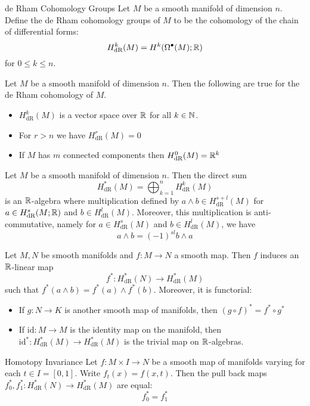 \documentclass[a4paper]{article}
\begin{document}
\begin{defn}{de Rham Cohomology Groups}{} Let $M$ be a smooth manifold of dimension $n$. Define the de Rham cohomology groups of $M$ to be the cohomology of the chain of differential forms: $$H_{\text{dR}}^k(M)=H^k(\Omega^\bullet(M);\mathbb{R})$$ for $0\leq k\leq n$. 
\end{defn}

\begin{prp}{}{} Let $M$ be a smooth manifold of dimension $n$. Then the following are true for the de Rham cohomology of $M$. 
\begin{itemize}
\item $H_{\text{dR}}^k(M)$ is a vector space over $\mathbb{R}$ for all $k\in\mathbb{N}$. 
\item For $r>n$ we have $H_{\text{dR}}^r(M)=0$
\item If $M$ has $m$ connected components then $H_{\text{dR}}^0(M)=\mathbb{R}^k$
\end{itemize}
\end{prp}

\begin{thm}{}{} Let $M$ be a smooth manifold of dimension $n$. Then the direct sum $$H_\text{dR}^\ast(M)=\bigoplus_{k=1}^nH_{\text{dR}}^k(M)$$ is an $\mathbb{R}$-algebra where multiplication defined by $a\wedge b\in H_{\text{dR}}^{s+l}(M)$ for $a\in H_{\text{dR}}^s(M;\mathbb{R})$ and $b\in H_{\text{dR}}^l(M)$. Moreover, this multiplication is anti-commutative, namely for $a\in H_{\text{dR}}^s(M)$ and $b\in H_{\text{dR}}^l(M)$, we have $$a\wedge b=(-1)^{sl}b\wedge a$$
\end{thm}

\begin{prp}{}{} Let $M,N$ be smooth manifolds and $f:M\to N$ a smooth map. Then $f$ induces an $\mathbb{R}$-linear map $$f^\ast:H_\text{dR}^\ast(N)\to H_\text{dR}^\ast(M)$$ such that $f^\ast(a\wedge b)=f^\ast(a)\wedge f^\ast(b)$. Moreover, it is functorial: 
\begin{itemize}
\item If $g:N\to K$ is another smooth map of manifolds, then $(g\circ f)^\ast=f^\ast\circ g^\ast$
\item If $\text{id}:M\to M$ is the identity map on the manifold, then $\text{id}^\ast:H_\text{dR}^\ast(M)\to H_\text{dR}^\ast(M)$ is the trivial map on $\mathbb{R}$-algebras. 
\end{itemize}
\end{prp}

\begin{thm}{Homotopy Invariance}{} Let $f:M\times I\to N$ be a smooth map of manifolds varying for each $t\in I=[0,1]$. Write $f_t(x)=f(x,t)$. Then the pull back maps $f_0^\ast,f_1^\ast:H_\text{dR}^\ast(N)\to H_\text{dR}^\ast(M)$ are equal: $$f_0^\ast=f_1^\ast$$
\end{thm}
\end{document}
